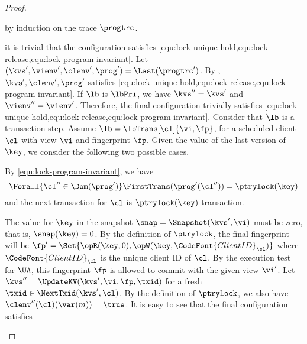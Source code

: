 \begin{proof}
\begin{Formulae}
\begin{Formula}
    \label{equ:lock-program-invariant}
\end{Formula}
\end{Formulae}
by induction on the trace \( \progtrc \).
\begin{enumerate}
    it is trivial that the configuration satisfies \cref{equ:lock-unique-hold,equ:lock-release,equ:lock-program-invariant}.
    Let \( (\kvs',\vienv',\clenv',\prog') = \Last(\progtrc') \).
    By \ih, \( \kvs',\clenv',\prog' \) satisfies \cref{equ:lock-unique-hold,equ:lock-release,equ:lock-program-invariant}.
    If \( \lb \) is \( \lbPri \), we have \( \kvs'' = \kvs' \) and \( \vienv''  = \vienv' \).
    Therefore, the final configuration trivially satisfies \cref{equ:lock-unique-hold,equ:lock-release,equ:lock-program-invariant}.
    Consider that \( \lb \) is a transaction step.
    Assume \( \lb = \lbTrans[\cl]{\vi,\fp} \),
    for a scheduled client \( \cl \) with view \( \vi \) and fingerprint \( \fp \).
    Given the value of the last version of \( \key \), we consider the following two possible cases.
    \begin{enumerate}
        By \cref{equ:lock-program-invariant}, we have 
        \[
            \Forall{\cl'' \in \Dom(\prog')} \FirstTrans(\prog'(\cl'')) = \ptrylock(\key)  
        \]
        and the next transaction for \( \cl \) is \(\ptrylock(\key) \) transaction.
        \begin{enumerate}
            The value for \( \key \) in the snapshot \( \snap = \Snapshot(\kvs',\vi) \) must be zero,
            that is, \( \snap(\key) = 0 \).
            By the definition of \( \ptrylock \),
            the final fingerprint will be \( \fp' =  \Set{\opR(\key,0), \opW(\key,\CodeFont{ClientID}_{\cl}) }\)
            where \( \CodeFont{ClientID}_{\cl} \) is the unique client ID  of \( \cl \).
            By the execution test for \( \UA \), this fingerprint \( \fp \) is allowed to commit 
            with the given view \( \vi' \).
            Let \( \kvs'' = \UpdateKV(\kvs',\vi,\fp,\txid) \) 
            for a fresh \( \txid \in \NextTxid(\kvs',\cl) \).
            By the definition of \( \ptrylock \),
            we also have \( \clenv''(\cl)(\var(m)) = \true\).
            It is easy to see that the final configuration satisfies 

\end{enumerate}
\end{enumerate}
\end{enumerate}
\end{proof}
